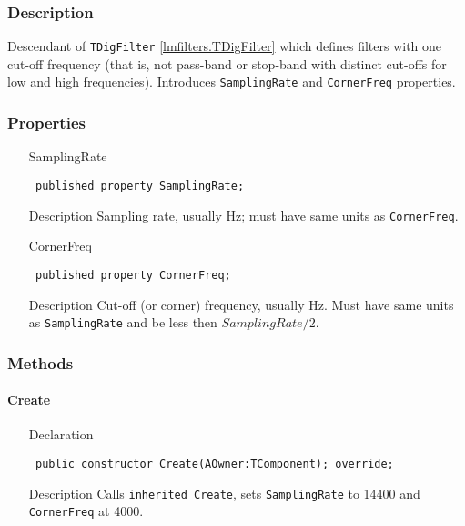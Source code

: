 \documentclass[12pt,a4paper,oneside]{report}
\newcommand{\declarationitem}[1]{{\addfontfeatures{FakeSlant} #1}}
\newcommand{\descriptiontitle}[1]{{\addfontfeatures{FakeSlant}#1}}
\newcommand{\inlineitem}[1]{{\addfontfeatures{FakeBold} #1}}
\newcommand{\code}[1]{\texttt{#1}}
\begin{document}
\subsubsection{Description}
Descendant of \code{TDigFilter} \ref{lmfilters.TDigFilter} which defines filters with one cut-off frequency (that is, not pass-band or stop-band with distinct cut-offs for low and high frequencies). Introduces \code{SamplingRate} and \code{CornerFreq} properties.
\subsubsection{Properties}
\begin{itemize}\label{lmfilters.TOneFreqFilter-SamplingRate}
	\item[\inlineitem{SamplingRate}\hfill]
	\begin{flushleft}
		\code{
			published property SamplingRate;}
	\end{flushleft}
	\item[\descriptiontitle{Description}]
	Sampling rate, usually Hz; must have same units as \code{CornerFreq}.
	\label{lmfilters.TOneFreqFilter-Cutfreq1}
	\item[\inlineitem{CornerFreq}\hfill]
	\begin{flushleft}
		\code{
			published property CornerFreq;}
	\end{flushleft}
	\item[\descriptiontitle{Description}] Cut-off (or corner) frequency, usually Hz. Must have same units as \code{SamplingRate} and be less then \code{$SamplingRate/2$}.
	\end{itemize}
\subsubsection{Methods}
\paragraph{Create}
\label{lmfilters.TOneFreqFilter-Create}
\begin{itemize}\item[\declarationitem{Declaration}\hfill]
	\begin{flushleft}
		\code{
			public constructor Create(AOwner:TComponent); override;}
	\end{flushleft}
\item[\descriptiontitle{Description}] Calls \code{inherited Create}, sets \code{SamplingRate} to 14400 and \code{CornerFreq} at 4000.
\end{itemize}
\end{document}
